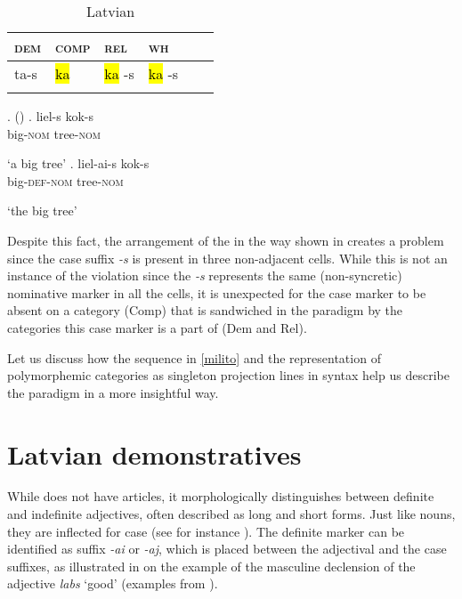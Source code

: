 \begin{table}
\caption{Latvian}
\label{Lat:problem}
\begin{tabular}[h]{ l l l l l l }
\lsptoprule
\textsc{dem} 	& \textsc{comp} 	& \textsc{rel}  	& \textsc{wh}\\	
\midrule
ta-s & \hl{ ka } & \hl{ ka }-s & \hl{ ka }-s\\
\lspbottomrule
\end{tabular}
\end{table}


\ex.  (\citealt[84]{Lyons1999})\label{conc1}
\ag. liel-s kok-s\\
big-\textsc{nom} tree-\textsc{nom}\\
\strut `a big tree'
\bg. liel-ai-s kok-s\\
big-\textsc{def-nom} tree-\textsc{nom}\\
\strut `the big tree'\label{Lat:koks}

Despite this fact, the arrangement of the   in the way shown  in   creates a problem since the case suffix \textit{-s} is present in three non-adjacent cells. While this is not an instance of the  violation since the \textit{-s}  represents the same (non-syncretic) nominative marker in all the cells, it is unexpected for the case marker to be absent on a category (Comp) that is sandwiched in the paradigm by the categories this case marker is a part of (Dem and Rel). 
\par
Let us discuss how the sequence in \ref{milito} and the representation of polymorphemic categories as  singleton projection lines in syntax help us describe the  paradigm in a more insightful way.

\section{Latvian demonstratives}\largerpage

While  does not have articles, it morphologically distinguishes between definite and indefinite adjectives, often described as long and short forms. Just like  nouns, they are inflected for case (see for instance \citealt[57--58]{Mathiassen1997}). The definite marker can be identified as suffix \textit{-ai} or \textit{-aj}, which is placed between the adjectival  and the case suffixes, as illustrated in  on the example of the masculine declension of the adjective \textit{labs} `good' (examples from \citealt[293--294]{Eckert-etal-1994}). 

